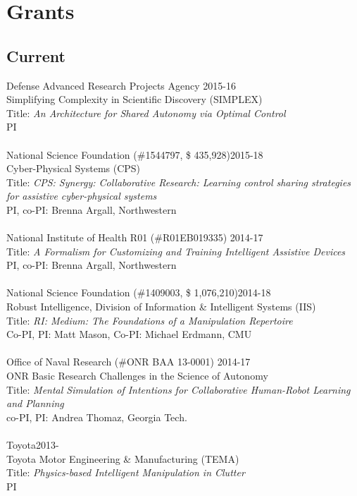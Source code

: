 
\section{Grants}

\subsection{Current}
\noindent
Defense Advanced Research Projects Agency \hfill 2015-16\\
Simplifying Complexity in Scientific Discovery (SIMPLEX)\\
Title: \textit{An Architecture for Shared Autonomy via Optimal Control}\\
PI\\
\\
National Science Foundation (\#1544797, \$ 435,928)\hfill 2015-18\\
Cyber-Physical Systems (CPS)\\
Title: \textit{CPS: Synergy: Collaborative Research: Learning control sharing strategies for assistive cyber-physical systems}\\
PI, co-PI: Brenna Argall, Northwestern\\
\\
National Institute of Health R01 (\#R01EB019335) \hfill 2014-17\\
Title: \textit{A Formalism for Customizing and Training Intelligent Assistive Devices}\\
PI, co-PI: Brenna Argall, Northwestern\\
\\
National Science Foundation (\#1409003, \$ 1,076,210)\hfill 2014-18\\
Robust Intelligence, Division of Information \& Intelligent Systems (IIS)\\
Title: \textit{RI: Medium: The Foundations of a Manipulation Repertoire}\\
Co-PI, PI: Matt Mason, Co-PI: Michael Erdmann, CMU\\
\\
Office of Naval Research (\#ONR BAA 13-0001) \hfill 2014-17\\
ONR Basic Research Challenges in the Science of Autonomy\\
Title: \textit{Mental Simulation of Intentions for Collaborative Human-Robot Learning and Planning}\\
co-PI, PI: Andrea Thomaz, Georgia Tech.	\\
\\
Toyota\hfill 2013-\\
Toyota Motor Engineering \& Manufacturing (TEMA)\\
Title: \textit{Physics-based Intelligent Manipulation in Clutter}\\
PI\\
\\

